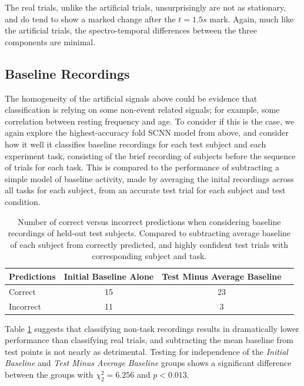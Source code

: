 \documentclass[fleqn,10pt]{wlscirep}
\begin{document}
The real trials, unlike the artificial trials, unsurprisingly are not as stationary, and do tend to show a marked change after the $t=1.5s$ mark. Again, much like the artificial trials, the spectro-temporal differences between the three components are minimal.

\subsection*{Baseline Recordings}

The homogeneity of the artificial signals above could be evidence that classification is relying on some non-event related signals; for example, some correlation between resting frequency and age. To consider if this is the case, we again explore the highest-accuracy fold SCNN model from above, and consider how it well it classifies baseline recordings for each test subject and each experiment task, consisting of the brief recording of subjects before the sequence of trials for each task. This is compared to the performance of subtracting a simple model of baseline activity, made by averaging the inital recordings across all tasks for each subject, from an accurate test trial for each subject and test condition.

\begin{table}[h]
 \caption{Number of correct versus incorrect predictions when considering baseline recordings of held-out test subjects. Compared to subtracting average baseline of each subject from correctly predicted, and highly confident test trials with corresponding subject and task.}
 \centering
 \begin{tabular}{l | c | c | c}
   \toprule
   \textbf{Predictions} &  \textbf{Initial Baseline Alone} & \textbf{Test Minus Average Baseline} \\
   \toprule
                        Correct           & 15 & 23  \\
                        Incorrect         & 11 &  3  \\ 
   \bottomrule
 \end{tabular}
 \label{tab:rest_performance3}
\end{table}

Table \ref{tab:rest_performance3} suggests that classifying non-task recordings results in dramatically lower performance than classifying real trials, and subtracting the mean baseline from test points is not nearly as detrimental. Testing for independence of the {\em Initial Baseline} and {\em Test Minus Average Baseline} groups shows a significant difference between the groups with $\chi^2_{2}=6.256$ and $p<0.013$.
\end{document}
